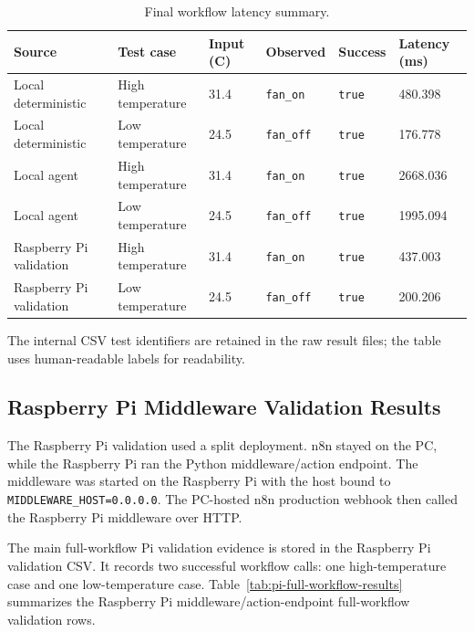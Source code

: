 \begin{table}[H]
  \centering
  \small
  \renewcommand{\arraystretch}{1.15}
  \caption{Final workflow latency summary.}
  \label{tab:final-workflow-latency-summary}
  \begin{tabularx}{\textwidth}{@{}L{0.24\textwidth}L{0.18\textwidth}L{0.10\textwidth}L{0.13\textwidth}L{0.10\textwidth}Y@{}}
    \toprule
    Source & Test case & Input (C) & Observed & Success & Latency (ms) \\
    \midrule
    Local deterministic & High temperature & 31.4 & \texttt{fan\_on} & \texttt{true} & 480.398 \\
    Local deterministic & Low temperature & 24.5 & \texttt{fan\_off} & \texttt{true} & 176.778 \\
    Local agent & High temperature & 31.4 & \texttt{fan\_on} & \texttt{true} & 2668.036 \\
    Local agent & Low temperature & 24.5 & \texttt{fan\_off} & \texttt{true} & 1995.094 \\
    Raspberry Pi validation & High temperature & 31.4 & \texttt{fan\_on} & \texttt{true} & 437.003 \\
    Raspberry Pi validation & Low temperature & 24.5 & \texttt{fan\_off} & \texttt{true} & 200.206 \\
    \bottomrule
  \end{tabularx}
\end{table}

The internal CSV test identifiers are retained in the raw result files; the table uses human-readable labels for readability.

\subsection{Raspberry Pi Middleware Validation Results}\label{subsec:results-pi-validation}

The Raspberry Pi validation used a split deployment. n8n stayed on the PC, while the Raspberry Pi ran the Python middleware/action endpoint. The middleware was started on the Raspberry Pi with the host bound to \texttt{MIDDLEWARE\_HOST=0.0.0.0}. The PC-hosted n8n production webhook then called the Raspberry Pi middleware over HTTP.

The main full-workflow Pi validation evidence is stored in the Raspberry Pi validation CSV. It records two successful workflow calls: one high-temperature case and one low-temperature case. Table~\ref{tab:pi-full-workflow-results} summarizes the Raspberry Pi middleware/action-endpoint full-workflow validation rows.

